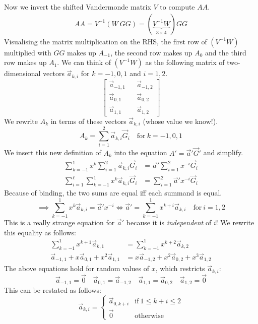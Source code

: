 Now we invert the shifted Vandermonde matrix $V$ to compute $AA$.
%
\begin{align*}
    AA = V^{-1} (W\ GG) = (\underbrace{V^{-1} W}_{3 \times 4}) GG
\end{align*}
%
Visualising the matrix multiplication on the RHS,
the first row of $(V^{-1} W)$ multiplied with $GG$ makes up $A_{-1}$,
the second row makes up $A_0$ and the third row makes up $A_1$.
We can think of $(V^{-1} W)$ as the following matrix of two-dimensional vectors $\vec{a}_{k, i}$ for $k = -1, 0, 1$ and $i = 1, 2$.
%
\[
    \begin{bmatrix}
        \vec{a}_{-1, 1} && \vec{a}_{-1, 2} \\
        \vec{a}_{0, 1} && \vec{a}_{0, 2} \\
        \vec{a}_{1, 1} && \vec{a}_{1, 2}
    \end{bmatrix}
\]
%
We rewrite $A_k$ in terms of these vectors $\vec{a}_{k, i}$ (whose value we know!).
%
\[
    A_k = \sum^2_{i = 1} \vec{a}_{k, i} \vec{G}_i \quad \text{for}\ k = -1, 0, 1
\]
%
We insert this new definition of $A_k$ into the equation $A' = \vec{a}'\vec{G}'$ and simplify.
%
\begin{align*}
    \sum^{1}_{k = -1} x^k \sum^2_{i = 1} \vec{a}_{k, i} \vec{G}_i &= \vec{a}' \sum^2_{i = 1} x^{-i} \vec{G}_i \\
    \sum^\ell_{i = 1} \sum^{1}_{k = -1} x^k \vec{a}_{k, i} \vec{G}_i &= \sum^2_{i = 1} \vec{a}' x^{-i} \vec{G}_i
\end{align*}
%
Because of binding, the two sums are equal iff each summand is equal.
%
\[
    \implies \sum^{1}_{k = -1} x^k \vec{a}_{k, i} = \vec{a}' x^{-i} \iff
    \vec{a}' = \sum^{1}_{k = -1} x^{k + i} \vec{a}_{k, i} \quad \text{for}\ i = 1, 2
\]
This is a really strange equation for $\vec{a}'$ because it is \emph{independent} of $i$!
We rewrite this equality as follows:
%
\begin{align*}
    \sum^{1}_{k = -1} x^{k + 1} \vec{a}_{k, 1} &= \sum^{1}_{k = -1} x^{k + 2} \vec{a}_{k, 2} \\
    \vec{a}_{-1, 1} + x\vec{a}_{0, 1} + x^2\vec{a}_{1, 1} &= x\vec{a}_{-1, 2} + x^2\vec{a}_{0, 2} + x^3\vec{a}_{1, 2}
\end{align*}
%
The above equations hold for random values of $x$, which restricts $\vec{a}_{k, i}$:
%
\[
    \vec{a}_{-1, 1} = \vec{0} \quad \vec{a}_{0, 1} = \vec{a}_{-1, 2} \quad \vec{a}_{1, 1} = \vec{a}_{0, 2} \quad \vec{a}_{1, 2} = \vec{0}
\]
%
This can be restated as follows:
%
\[
    \vec{a}_{k, i} = \begin{cases}
        \vec{a}_{0, k + i} & \text{if}\ 1 \leq k + i \leq 2 \\
        \vec{0} & \text{otherwise}
    \end{cases}
\]
